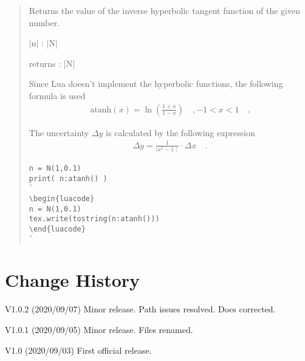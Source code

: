 \documentclass{ltxdoc}
\begin{document}
\begin{quote}
  Returns the value of the inverse hyperbolic tangent function of the given number.

  \begin{description}
  \item |n| : |N|

  \item returns : |N|
  \end{description}

  Since Lua doesn't implement the hyperbolic functions, the following formula is used
  \begin{align*}
    \text{atanh}(x) = \ln\left( \frac{1 + x}{1 - x} \right)  \quad, -1 < x < 1 \quad.
  \end{align*}

  The uncertainty $\Delta y$ is calculated by the following expression
  \begin{align*}
    \Delta y = \frac{1}{\mid x^2 - 1 \mid} \cdot \Delta x \quad.
  \end{align*}



\begin{lstlisting}
n = N(1,0.1)
print( n:atanh() )
`
\begin{luacode}
n = N(1,0.1)
tex.write(tostring(n:atanh()))
\end{luacode}
`
\end{lstlisting}

\end{quote}










\newpage
\section{Change History}

V1.0.2 \quad (2020/09/07) Minor release. Path issues resolved. Docs corrected.

V1.0.1 \quad (2020/09/05) Minor release. Files renamed. 

V1.0 \quad (2020/09/03) First official release.





\newpage
{}




\newpage
{}
\indexprologue{}
\printindex[unit]

\newpage
{}
\indexprologue{}
\printindex[cur]

\newpage
{}
\indexprologue{}
\printindex[lua]
\end{document}
